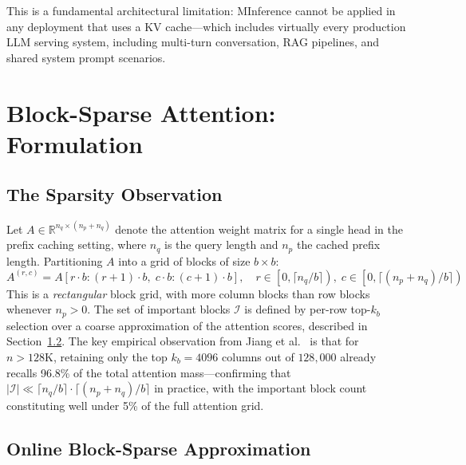 \documentclass{article}
\begin{document}
This is a fundamental architectural limitation: MInference cannot be
applied in any deployment that uses a KV cache---which includes virtually
every production LLM serving system, including multi-turn conversation,
RAG pipelines, and shared system prompt scenarios.

\section{Block-Sparse Attention: Formulation}
\label{sec:sparse}

\subsection{The Sparsity Observation}

Let $A \in \mathbb{R}^{n_q \times (n_p + n_q)}$ denote the attention
weight matrix for a single head in the prefix caching setting, where
$n_q$ is the query length and $n_p$ the cached prefix length. Partitioning
$A$ into a grid of blocks of size $b \times b$:
%
\begin{equation}
  A^{(r,c)} = A[r \cdot b : (r+1) \cdot b,\; c \cdot b : (c+1) \cdot b],
  \quad r \in \left[0, \lceil n_q/b \rceil\right),\;
       c \in \left[0, \lceil (n_p+n_q)/b \rceil\right)
  \label{eq:block-partition}
\end{equation}
%
This is a \textit{rectangular} block grid, with more column blocks than
row blocks whenever $n_p > 0$. The set of important blocks $\mathcal{I}$
is defined by per-row top-$k_b$ selection over a coarse approximation of
the attention scores, described in Section~\ref{sec:approx}. The key
empirical observation from Jiang et al.\ \cite{minference} is that for
$n > 128\text{K}$, retaining only the top $k_b = 4096$ columns out of
$128{,}000$ already recalls 96.8\% of the total attention
mass---confirming that $|\mathcal{I}| \ll \lceil n_q/b\rceil \cdot
\lceil(n_p+n_q)/b\rceil$ in practice, with the important block count
constituting well under 5\% of the full attention grid.

\subsection{Online Block-Sparse Approximation}
\label{sec:approx}
\end{document}
